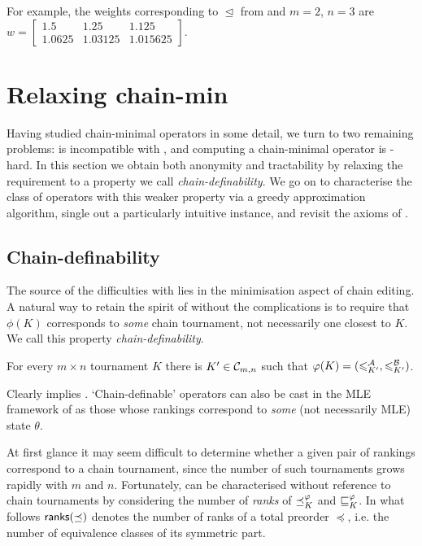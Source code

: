 For example, the weights corresponding to $\trianglelefteq$ from
 and $m = 2$, $n = 3$ are
$
    w = \left[\begin{smallmatrix}
        1.5 & 1.25 & 1.125 \\
        1.0625 & 1.03125 & 1.015625
    \end{smallmatrix}\right]
$.

\section{Relaxing chain-min}
\label{tourn_sec_relaxing_chain_min}

Having studied chain-minimal operators in some detail, we turn to two remaining
problems:  is incompatible with , and
computing a chain-minimal operator is -hard. In this
section we obtain both anonymity and tractability by relaxing the
 requirement to a property we call
\emph{chain-definability}. We go on to characterise the class of operators with
this weaker property via a greedy approximation algorithm, single out a
particularly intuitive instance, and revisit the axioms of
.

\subsection{Chain-definability}

The source of the difficulties with  lies in the
minimisation aspect of chain editing. A natural way to retain the spirit of
 without the complications is to require that $\phi(K)$
corresponds to \emph{some} chain tournament, not necessarily one closest to
$K$. We call this property \emph{chain-definability}.

\begin{axiom}
    For every $m \times n$ tournament $K$ there is $K' \in \mathcal{C}_{m,n}$ such that
    $\varphi(K) = ({\leqslant^{\mathcal{A}}_{K'}}, {\leqslant^{\mathcal{B}}_{K'}})$.
\end{axiom}

Clearly  implies . `Chain-definable'
operators can also be cast in the MLE framework of  as those
whose rankings correspond to \emph{some} (not necessarily MLE) state $\theta$.

At first glance it may seem difficult to determine whether a given pair of
rankings correspond to a chain tournament, since the number of such tournaments
grows rapidly with $m$ and $n$.
%
Fortunately,  can be characterised without reference to
chain tournaments by considering the number of \emph{ranks} of ${\preceq_K^\varphi}$
and ${\sqsubseteq_K^\varphi}$. In what follows $\mathsf{ranks}({\preceq})$ denotes the number of
ranks of a total preorder $\preceq$, i.e. the number of equivalence classes of
its symmetric part.

